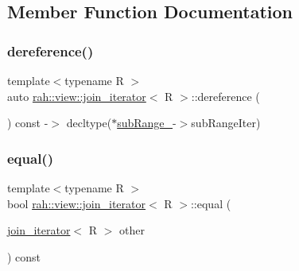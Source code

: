 \subsection{Member Function Documentation}
\mbox{\label{structrah_1_1view_1_1join__iterator_ac7bc0fcd91d164f86d5813421a08d38a}} 
\subsubsection{\texorpdfstring{dereference()}{dereference()}}
{\footnotesize\ttfamily template$<$typename R $>$ \\
auto \mbox{\hyperlink{structrah_1_1view_1_1join__iterator}{rah\+::view\+::join\+\_\+iterator}}$<$ R $>$\+::dereference (\begin{DoxyParamCaption}{ }\end{DoxyParamCaption}) const -\/$>$ decltype($\ast$\mbox{\hyperlink{structrah_1_1view_1_1join__iterator_ae9351284af0f64c368606315da0b56a5}{sub\+Range\+\_\+}}-\/$>$sub\+Range\+Iter) \hspace{0.3cm}{\ttfamily [inline]}}

\mbox{\label{structrah_1_1view_1_1join__iterator_a76c4e51e7c191e189e01d15eff2b7055}} 
\subsubsection{\texorpdfstring{equal()}{equal()}}
{\footnotesize\ttfamily template$<$typename R $>$ \\
bool \mbox{\hyperlink{structrah_1_1view_1_1join__iterator}{rah\+::view\+::join\+\_\+iterator}}$<$ R $>$\+::equal (\begin{DoxyParamCaption}\item[{\mbox{\hyperlink{structrah_1_1view_1_1join__iterator}{join\+\_\+iterator}}$<$ R $>$}]{other }\end{DoxyParamCaption}) const\hspace{0.3cm}{\ttfamily [inline]}}

\mbox{\label{structrah_1_1view_1_1join__iterator_a4f81464b6ff2707bb21d2bbd409c4f4d}} 
